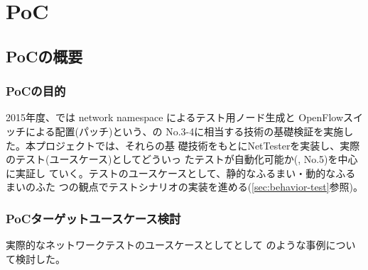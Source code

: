 
\chapter{PoC}
\label{chap:poc}

 \section{PoCの概要}
 \label{sec:poc-overview}



 \subsection{PoCの目的}
 \label{sec:poc-purpose}

2015年度、\lopjc では network namespace によるテスト用ノード生成と
OpenFlowスイッチによる配置(パッチ)という、の
No.3-4に相当する技術の基礎検証を実施した。本プロジェクトでは、それらの基
礎技術をもとにNetTesterを実装し、実際のテスト(ユースケース)としてどういっ
たテストが自動化可能か(, No.5)を中心に実証し
ていく。テストのユースケースとして、静的なふるまい・動的なふるまいのふた
つの観点でテストシナリオの実装を進める(\ref{sec:behavior-test}参照)。

  \subsection{PoCターゲットユースケース検討}
  \label{sec:poc-usecase-discuss}

実際的なネットワークテストのユースケースとしてとして
のような事例について検討した。

